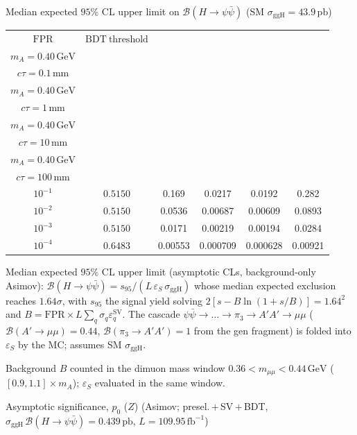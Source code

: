 \documentclass[10pt,a4paper]{article}
\begin{document}
{\vspace{12pt}

Median expected $95\%$ CL upper limit on $\mathcal{B}(H\to\psi\bar{\psi})$ (SM $\sigma_{\mathrm{ggH}}=43.9\,\mathrm{pb}$)

\begin{tabular}{cccccc}
\toprule
$\mathrm{FPR}$ & $\mathrm{BDT\ threshold}$ & \shortstack{$m_{\pi}=4\,\mathrm{GeV}$\\$m_{A}=0.40\,\mathrm{GeV}$\\$c\tau=0.1\,\mathrm{mm}$} & \shortstack{$m_{\pi}=4\,\mathrm{GeV}$\\$m_{A}=0.40\,\mathrm{GeV}$\\$c\tau=1\,\mathrm{mm}$} & \shortstack{$m_{\pi}=4\,\mathrm{GeV}$\\$m_{A}=0.40\,\mathrm{GeV}$\\$c\tau=10\,\mathrm{mm}$} & \shortstack{$m_{\pi}=4\,\mathrm{GeV}$\\$m_{A}=0.40\,\mathrm{GeV}$\\$c\tau=100\,\mathrm{mm}$} \\
\midrule
$10^{-1}$ & $0.5150$ & 0.169 & 0.0217 & 0.0192 & 0.282\\
$10^{-2}$ & $0.5150$ & 0.0536 & 0.00687 & 0.00609 & 0.0893\\
$10^{-3}$ & $0.5150$ & 0.0171 & 0.00219 & 0.00194 & 0.0284\\
$10^{-4}$ & $0.6483$ & 0.00553 & 0.000709 & 0.000628 & 0.00921\\
\bottomrule
\end{tabular}

{\small Median expected $95\%$ CL upper limit (asymptotic CLs, background-only Asimov): $\mathcal{B}(H\to\psi\bar{\psi})=s_{95}/(L\,\varepsilon_S\,\sigma_{\mathrm{ggH}})$ whose median expected exclusion reaches $1.64\sigma$, with $s_{95}$ the signal yield solving $2[s-B\ln(1{+}s/B)]=1.64^2$ and $B=\mathrm{FPR}\times L\sum_q\sigma_q\varepsilon_q^{\mathrm{SV}}$. The cascade $\psi\bar{\psi}\to\ldots\to\pi_3\to A'A'\to\mu\mu$ ($\mathcal{B}(A'\to\mu\mu)=0.44$, $\mathcal{B}(\pi_3\to A'A')=1$ from the gen fragment) is folded into $\varepsilon_S$ by the MC; assumes SM $\sigma_{\mathrm{ggH}}$.}

{\small Background $B$ counted in the dimuon mass window $0.36<m_{\mu\mu}<0.44\,\mathrm{GeV}$ ($[0.9,1.1]\times m_A$); $\varepsilon_S$ evaluated in the same window.}

\vspace{12pt}

Asymptotic significance, $p_0$ ($Z$) (Asimov; presel.\,$+$\,SV\,$+$\,BDT, $\sigma_{\mathrm{ggH}}\,\mathcal{B}(H\to\psi\bar{\psi})=0.439\,\mathrm{pb}$, $L=109.95\,\mathrm{fb}^{-1}$)

}
\end{document}
